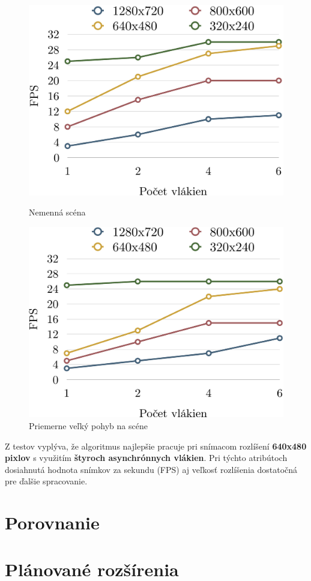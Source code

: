 \begin{figure}[H]
  \centering
  \begin{minipage}[b]{0.49\textwidth}
    \includegraphics[width=\textwidth]{images/substractorCalm}
    \caption{Nemenná scéna}
  \end{minipage}
  \hfill
  \begin{minipage}[b]{0.49\textwidth}
    \includegraphics[width=\textwidth]{images/substractorNormal}
    \caption{Priemerne veľký pohyb na scéne}
  \end{minipage}
\end{figure}

Z testov vyplýva, že algoritmus najlepšie pracuje pri snímacom rozlíšení \textbf{640x480 pixlov} s využitím \textbf{štyroch asynchrónnych vlákien}. Pri týchto atribútoch dosiahnutá hodnota snímkov za sekundu (FPS) aj veľkosť rozlíšenia dostatočná pre ďalšie spracovanie. 



\section{Porovnanie}













\section{Plánované rozšírenia}



